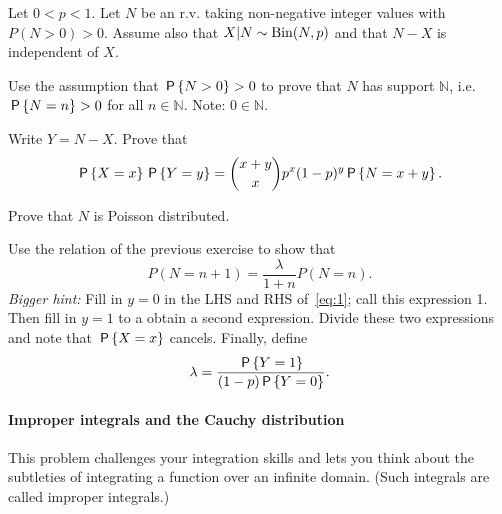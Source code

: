 \documentclass[assignments]{subfiles}
\begin{document}
Let $0 < p < 1$. Let $N$ be an r.v. taking non-negative integer values with $P(N > 0) > 0$.
Assume also that  $X|N\sim\Bin{N,p}$ and that $N-X$ is independent of $X$.

\begin{exercise}
 Use the assumption that $\P{N>0}>0$ to prove that $N$ has support $\mathbb N$, i.e. $\P{N=n} > 0$ for all $n \in \mathbb N$. Note: $0 \in \mathbb N$.
\begin{solution}
\end{solution}
\end{exercise}

\begin{exercise}
Write $Y = N-X$. Prove that
\begin{equation}
\label{eq:1}
\P{X=x}\P{Y=y} = {x+y \choose x} p^x (1-p)^y \P{N=x+y}.
\end{equation}
\begin{solution}
\end{solution}
\end{exercise}


\begin{exercise}
Prove that $N$ is Poisson distributed.
\begin{hint}
Use the relation of the previous exercise to show that
\begin{equation}
  \label{eq:3}
P(N=n+1) = \frac{\lambda}{1+n} P(N=n).
\end{equation}
\textit{Bigger hint:} Fill in $y=0$ in the LHS and RHS of~\cref{eq:1}; call this expression 1. Then fill in $y=1$ to a obtain a second expression. Divide these two expressions and note that $\P{X=x}$ cancels. Finally,  define
\begin{equation}
\label{eq:2}
\lambda = \frac{\P{Y=1}}{(1-p)\P{Y=0}}.
\end{equation}
\end{hint}
\begin{solution}
\end{solution}
\end{exercise}



\paragraph{Improper integrals and the Cauchy distribution}

This problem challenges your integration skills and lets you think about the subtleties of integrating a function over an infinite domain.
(Such integrals are called improper integrals.)
\end{document}
